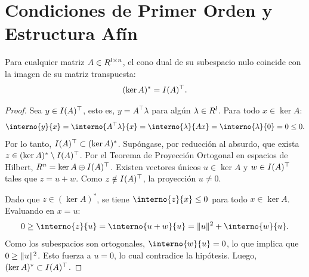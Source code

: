 
\section{Condiciones de Primer Orden y Estructura Afín}
\label{v1:sec:2.2}

\begin{lemma}\label{v1:lem:2.2.1}
	Para cualquier matriz $A \in R^{l \times n}$, el cono dual de su subespacio nulo coincide con la imagen de su matriz transpuesta:
	\[
		(\ker A)^* = I (A)^\top.
	\]
\end{lemma}

\begin{proof}
	Sea $y \in I (A)^\top$, esto es, $y = A^\top \lambda$ para algún $\lambda \in R^l$. Para todo $x \in \ker A$:
	\[
		\interno{y}{x} = \interno{A^\top \lambda}{x} = \interno{\lambda}{Ax} = \interno{\lambda}{0} = 0 \le 0.
	\]
	Por lo tanto, $I (A)^\top \subset (\ker A)^*$. Supóngase, por reducción al absurdo, que exista $z \in (\ker A)^* \setminus I (A)^\top$. Por el Teorema de Proyección Ortogonal en espacios de Hilbert, $R^n = \ker A \oplus I (A)^\top$. Existen vectores únicos $u \in \ker A$ y $w \in I (A)^\top$ tales que $z = u + w$. Como $z \notin I (A)^\top$, la proyección $u \neq 0$.
 
	Dado que $z \in (\ker A)^*$, se tiene $\interno{z}{x} \le 0$ para todo $x \in \ker A$. Evaluando en $x = u$:
	\[
		0 \ge \interno{z}{u} = \interno{u + w}{u} = \norm{u}^2 + \interno{w}{u}.
	\]
 Como los subespacios son ortogonales, $\interno{w}{u} = 0$, lo que implica que $0 \ge \lVert u\rVert^2$. Esto fuerza a $u = 0$, lo cual contradice la hipótesis. Luego, $(\ker A)^* \subset I (A)^\top$.
\end{proof}


